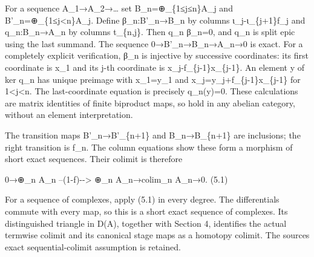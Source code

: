 For a sequence A\_\allowbreak{}1\allowbreak{}→A\_\allowbreak{}2\allowbreak{}→… set B\_\allowbreak{}n\allowbreak{}=\allowbreak{}⊕\_\allowbreak{}\{1≤j≤n\}A\_\allowbreak{}j and B'\_\allowbreak{}n\allowbreak{}=\allowbreak{}⊕\_\allowbreak{}\{1≤j<n\}A\_\allowbreak{}j. Define β\_\allowbreak{}n:\allowbreak{}B'\_\allowbreak{}n\allowbreak{}→B\_\allowbreak{}n by columns ι\_\allowbreak{}j-ι\_\allowbreak{}\{j\allowbreak{}+1\}f\_\allowbreak{}j and q\_\allowbreak{}n:\allowbreak{}B\_\allowbreak{}n\allowbreak{}→A\_\allowbreak{}n by columns t\_\allowbreak{}\{n,\allowbreak{}j\}. Then q\_\allowbreak{}n β\_\allowbreak{}n\allowbreak{}=0,\allowbreak{} and q\_\allowbreak{}n is split epic using the last summand. The sequence 0\allowbreak{}→B'\_\allowbreak{}n\allowbreak{}→B\_\allowbreak{}n\allowbreak{}→A\_\allowbreak{}n\allowbreak{}→0 is exact. For a completely explicit verification,\allowbreak{} β\_\allowbreak{}n is injective by successive coordinates:\allowbreak{} its first coordinate is x\_\allowbreak{}1 and its j-th coordinate is x\_\allowbreak{}j-f\_\allowbreak{}\{j-1\}x\_\allowbreak{}\{j-1\}. An element y of ker q\_\allowbreak{}n has unique preimage with x\_\allowbreak{}1\allowbreak{}=y\_\allowbreak{}1 and x\_\allowbreak{}j\allowbreak{}=y\_\allowbreak{}j\allowbreak{}+f\_\allowbreak{}\{j-1\}x\_\allowbreak{}\{j-1\} for 1\textless j\textless n. The last-coordinate equation is precisely q\_\allowbreak{}n(y)\allowbreak{}\allowbreak{}=0. These calculations are matrix identities of finite biproduct maps,\allowbreak{} so hold in any abelian category,\allowbreak{} without an element interpretation.

The transition maps B'\_\allowbreak{}n\allowbreak{}→B'\_\allowbreak{}\{n\allowbreak{}+1\} and B\_\allowbreak{}n\allowbreak{}→B\_\allowbreak{}\{n\allowbreak{}+1\} are inclusions; the right transition is f\_\allowbreak{}n. The column equations show these form a morphism of short exact sequences. Their colimit is therefore

0\allowbreak{}→\allowbreak{}⊕\_\allowbreak{}n A\_\allowbreak{}n --(1-f)\allowbreak{}-\allowbreak{}-> \allowbreak{}⊕\_\allowbreak{}n A\_\allowbreak{}n\allowbreak{}→colim\_\allowbreak{}n A\_\allowbreak{}n\allowbreak{}→0. (5.1)\allowbreak{}

For a sequence of complexes,\allowbreak{} apply (5.1)\allowbreak{} in every degree. The differentials commute with every map,\allowbreak{} so this is a short exact sequence of complexes. Its distinguished triangle in D(A)\allowbreak{},\allowbreak{} together with Section 4,\allowbreak{} identifies the actual termwise colimit and its canonical stage maps as a homotopy colimit. The source\textquotesingle s exact sequential-colimit assumption is retained.

